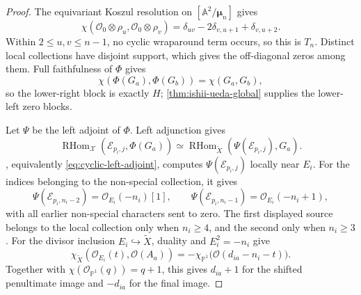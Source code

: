 \documentclass[11pt]{article}
\theoremstyle{plain}
\theoremstyle{definition}
\theoremstyle{remark}
\newcommand{\A}{\mathbb A}
\newcommand{\Pp}{\mathbb P}
\newcommand{\RHom}{\operatorname{RHom}}
\newcommand{\XX}{\mathcal X}
\newcommand{\OO}{\mathcal O}
\begin{document}
\begin{proof}
The equivariant Koszul resolution on
\([\A^2/\boldsymbol\mu_n]\) gives
\[
\chi(\OO_0\otimes\rho_u,\OO_0\otimes\rho_v)
=\delta_{uv}-2\delta_{v,u+1}+\delta_{v,u+2}.
\]
Within \(2\leq u,v\leq n-1\), no cyclic wraparound term occurs,
so this is \(T_n\). Distinct local collections have disjoint support,
which gives the off-diagonal zeros among them. Full faithfulness of
\(\Phi\) gives
\[
\chi(\Phi(G_a),\Phi(G_b))=\chi(G_a,G_b),
\]
so the lower-right block is exactly \(H\); \cref{thm:ishii-ueda-global}
supplies the lower-left zero blocks.

Let \(\Psi\) be the left adjoint of \(\Phi\). Left adjunction gives
\[
\RHom_{\XX}(\mathcal E_{p_i,j},\Phi(G_a))
\simeq
\RHom_{\widetilde X}(\Psi(\mathcal E_{p_i,j}),G_a).
\]
, equivalently
\eqref{eq:cyclic-left-adjoint}, computes
\(\Psi(\mathcal E_{p_i,j})\) locally near \(E_i\). For the indices
belonging to the non-special collection, it gives
\[
\Psi(\mathcal E_{p_i,n_i-2})=\OO_{E_i}(-n_i)[1],
\qquad
\Psi(\mathcal E_{p_i,n_i-1})=\OO_{E_i}(-n_i+1),
\]
with all earlier non-special characters sent to zero. The first
displayed source belongs to the local collection only when \(n_i\geq4\),
and the second only when \(n_i\geq3\).
For the divisor inclusion \(E_i\hookrightarrow\widetilde X\),
duality and \(E_i^2=-n_i\) give
\[
\chi_{\widetilde X}(\OO_{E_i}(t),\OO(A_a))
=-\chi_{\Pp^1}\bigl(\OO(d_{ia}-n_i-t)\bigr).
\]
Together with \(\chi(\OO_{\Pp^1}(q))=q+1\), this gives \(d_{ia}+1\) for the
shifted penultimate image and \(-d_{ia}\) for the final image.
\end{proof}
\end{document}
